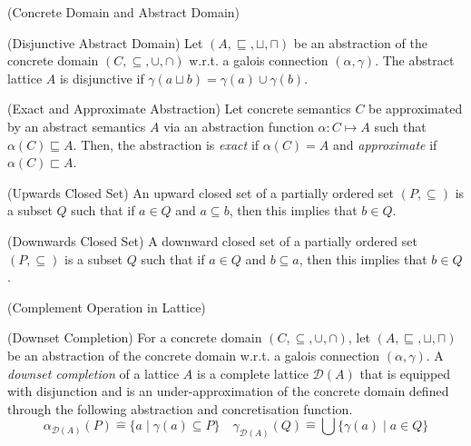 %
\begin{definition} (Concrete Domain and Abstract Domain)

\end{definition}
%
\begin{definition} (Disjunctive Abstract Domain)
Let $(A, \sqsubseteq, \sqcup, \sqcap)$ be an abstraction of the concrete domain
$(C, \subseteq, \cup, \cap)$ w.r.t. a galois connection $(\alpha, \gamma)$. The 
abstract lattice $A$ is disjunctive if $\gamma(a \sqcup b) = \gamma(a) \cup \gamma(b)$. 
\end{definition}
%
\begin{definition} (Exact and Approximate Abstraction)
Let concrete semantics $C$ be approximated by an abstract semantics $A$ via an 
abstraction function $\alpha\colon C \mapsto A$ such that $\alpha(C) \sqsubseteq A$. 
Then, the abstraction is \emph{exact} if $\alpha(C)=A$ and \emph{approximate} 
if $\alpha(C)\sqsubset A$.
\end{definition}
%
\begin{definition} (Upwards Closed Set)
  An upward closed set of a partially ordered set $(P, \subseteq)$ is a subset
  $Q$ such that if $a \in Q$ and $a \subseteq b$, then this implies that $b \in
  Q$. 
\end{definition}
%
\begin{definition} (Downwards Closed Set)
  A downward closed set of a partially ordered set $(P, \subseteq)$ is a subset
  $Q$ such that if $a \in Q$ and $b \subseteq a$, then this implies that $b \in
  Q$. 
\end{definition}
%
\begin{definition} (Complement Operation in Lattice)

\end{definition}
%
%  
\begin{definition} (Downset Completion)
For a concrete domain $(C, \subseteq, \cup, \cap)$, let $(A, \sqsubseteq, \sqcup, \sqcap)$ 
be an abstraction of the concrete domain w.r.t. a galois connection $(\alpha, \gamma)$.
A \emph{downset completion} of a lattice $A$ is a complete lattice $\mathcal{D}(A)$ 
that is equipped with disjunction and is an under-approximation of the concrete
domain defined through the following abstraction and concretisation function. 
  \[
    \alpha_{\mathcal{D}(A)}(P) \mathrel{\hat=} \{a \mid \gamma(a) \subseteq P\}
     \quad
     \gamma_{\mathcal{D}(A)}(Q) \mathrel{\hat=} \bigcup \{\gamma(a) \mid a \in Q\}
  \]
\end{definition}
%
